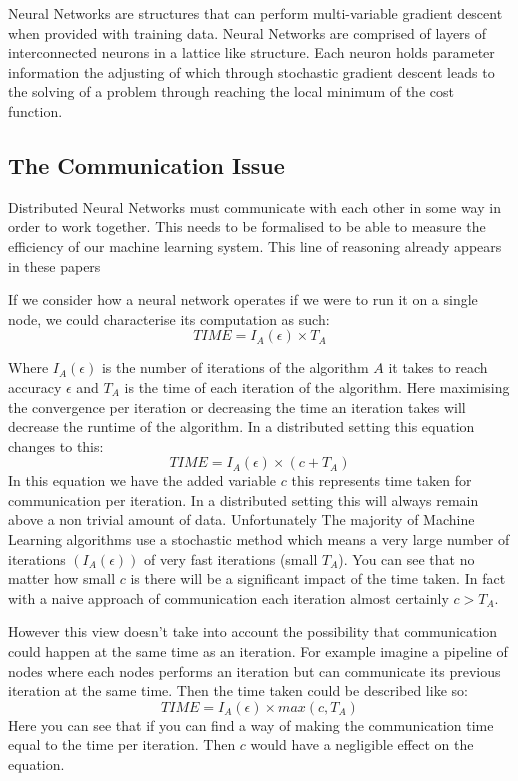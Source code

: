 Neural Networks are structures that can perform multi-variable gradient descent
when provided with training data. Neural Networks are comprised of layers of
interconnected neurons in a lattice like structure. Each neuron holds parameter
information the adjusting of which through stochastic gradient descent leads to
the solving of a problem through reaching the local minimum of the cost
function.

\subsection{The Communication Issue}
Distributed Neural Networks must communicate with each other in some way in
order to work together. This needs to be formalised to be able to measure the
efficiency of our machine learning system. This line of reasoning already
appears in these papers \cite{konevcny2016federated ,Ma2017DistributedOptimisation}

If we consider how a neural network operates if we were to run it on a single
node, we could characterise its computation as such:
\begin{equation}
    TIME = I_A (\epsilon) \times T_A 
\end{equation}

Where \(I_A(\epsilon)\) is the number of iterations of the algorithm \(A\) it
takes to reach accuracy \(\epsilon\) and \(T_A\) is the time of each iteration
of the algorithm. Here maximising the convergence per iteration or decreasing
the time an iteration takes will decrease the runtime of the algorithm. In a
distributed setting this equation changes to this:
\begin{equation}
    TIME = I_A (\epsilon) \times (c + T_A)  
\end{equation}
In this equation we have the added variable \(c\) this represents time taken for
communication per iteration. In a distributed setting this will always remain
above a non trivial amount of data. Unfortunately The majority of Machine
Learning algorithms use a stochastic method which means a very large number of
iterations \((I_A(\epsilon))\) of very fast iterations (small \(T_A\)). You can
see that no matter how small \(c\) is there will be a significant impact of the
time taken. In fact with a naive approach of communication each iteration almost
certainly \(c > T_A\).

However this view doesn't take into account the possibility that communication
could happen at the same time as an iteration. For example imagine a pipeline of
nodes where each nodes performs an iteration but can communicate its previous
iteration at the same time. Then the time taken could be described like so:
\begin{equation}
    TIME = I_A (\epsilon) \times max(c, T_A)
\end{equation}
Here you can see that if you can find a way of making the communication time
equal to the time per iteration. Then \(c\) would have a negligible effect on
the equation.

